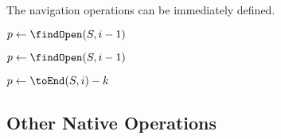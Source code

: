 \begin{algorithm}
\begin{algorithmic}
		\State {}
	\Else
		\State {}
	\EndIf
\EndFunction
\end{algorithmic}
\end{algorithm}

The navigation operations can be immediately defined.

\begin{algorithm}
\begin{algorithmic}
	\State $p \gets \findOpen(S, i - 1)$ 
	\State {}
\EndFunction
\end{algorithmic}
\end{algorithm}

\begin{algorithm}
\begin{algorithmic}
	\State {}
\EndFunction
\end{algorithmic}
\end{algorithm}

\begin{algorithm}
\begin{algorithmic}
	\State $p \gets \findOpen(S, i - 1)$
	\State {}
\EndFunction
\end{algorithmic}
\end{algorithm}

\begin{algorithm}
\begin{algorithmic}
	\State $p \gets \toEnd(S, i) - k$
	\State {}
\EndFunction
\end{algorithmic}
\end{algorithm}

\subsection{Other Native Operations}

\begin{algorithm}
\begin{algorithmic}
	\State {}
\EndFunction
\end{algorithmic}
\end{algorithm}

